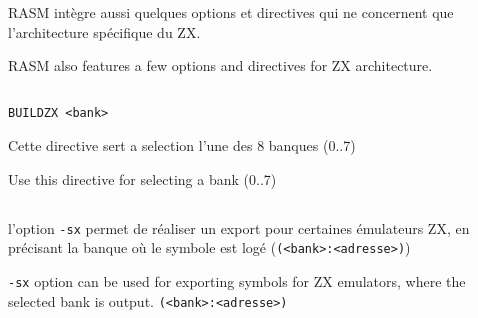 \section{}\label{PZX}

\begin{xfr}
RASM intègre aussi quelques options et directives qui ne concernent que l'architecture spécifique du ZX.
\end{xfr}

\begin{xen}
RASM also features a few options and directives for ZX architecture.
\end{xen}

\subsection{}

\subsubsection{}\label{ZXBANK}

\begin{verbatim}
BUILDZX <bank>
\end{verbatim}

\begin{xfr}
Cette directive sert a selection l'une des 8 banques (0..7)
\end{xfr}

\begin{xen}
Use this directive for selecting a bank (0..7) 
\end{xen}

\subsection{}

\begin{xfr}
l'option \texttt{-sx} permet de réaliser un export pour certaines émulateurs ZX, en précisant la banque où le symbole est logé (\texttt{(<bank>:<adresse>)})

\end{xfr}


\begin{xen}
\texttt{-sx} option can be used for exporting symbols for ZX emulators, where the selected bank is output. \texttt{(<bank>:<adresse>)}
\end{xen}
